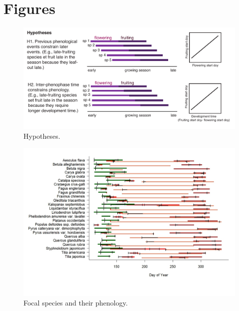 \documentclass{article}
\begin{document}
\section* {Figures}
\begin{figure}[p]
  \centering
  \includegraphics{../analyses/figures/hypotheses.pdf} 
  \caption{Hypotheses.} 
 \label{fig:hyp}
\end{figure}
 
\begin{figure}[h]
  \centering
  \includegraphics{../analyses/figures/grosea_errbars_1.jpeg}
  \caption{Focal species and their phenology.}
  \label{fig:focsp}
\end{figure}
  
\end{document}
